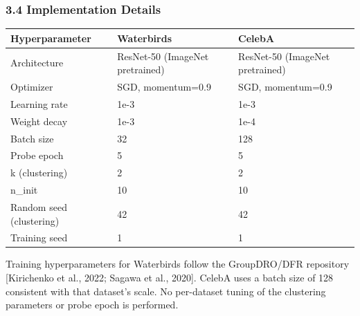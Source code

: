 \subsubsection{3.4 Implementation Details}

\begin{table}[htbp]
\centering
\begin{tabular}{lll}
\toprule
Hyperparameter & Waterbirds & CelebA \\
\midrule
Architecture & ResNet-50 (ImageNet pretrained) & ResNet-50 (ImageNet pretrained) \\
Optimizer & SGD, momentum=0.9 & SGD, momentum=0.9 \\
Learning rate & 1e-3 & 1e-3 \\
Weight decay & 1e-3 & 1e-4 \\
Batch size & 32 & 128 \\
Probe epoch & 5 & 5 \\
k (clustering) & 2 & 2 \\
n_init & 10 & 10 \\
Random seed (clustering) & 42 & 42 \\
Training seed & 1 & 1 \\
\bottomrule
\end{tabular}
\end{table}

Training hyperparameters for Waterbirds follow the GroupDRO/DFR repository [Kirichenko et al., 2022; Sagawa et al., 2020]. CelebA uses a batch size of 128 consistent with that dataset's scale. No per-dataset tuning of the clustering parameters or probe epoch is performed.

